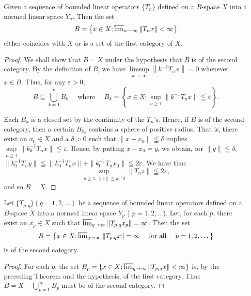 \begin{theoremn} Given a sequence of bounded linear operators $\{T_{n}\}$ defined on a $B$-space $X$ into a normed linear space $Y_{n}$. Then the set
\[
B = \left\{x \in X; \varlimsup\limits_{n \rightarrow \infty} \| T _{n} x \| < \infty \right\}
\]
either coincides with $X$ or is a set of the first category of $X$. 

\end{theoremn}
\begin{proof}
 We shall show that $B = X$ under the hypothesis that $B$ is of the second category. By the definition of $B$, we have $\limsup\limits_{k \to \infty} \left\|k^{-1} T_n x \right\| = 0$ whenever $x \in B$. Thus, for any $\varepsilon > 0$, 
\[
B \subseteq \bigcup\limits_{k=1} ^{\infty} B _{k} \quad \text{ where } \quad B _{k} = \left\{x \in X; \sup\limits _{n \geqq 1} \| k ^{-1} T _{n} x \| \leqq \varepsilon \right\}. \]

Each $B_{k}$ is a closed set by the continuity of the $T_{n}$'s. Hence, if $B$ is of the second category, then a certain $B_{k_0}$ contains a sphere of positive radius. That is, there exist an $x_0 \in X$ and a $\delta > 0$ such that $\|x - x_0\| \leqq \delta$ implies $\sup\limits_{n \geqq 1} \|k_0^{-1}T_n x\| \leqq \varepsilon$. Hence, by putting $x - x_0 = y$, we obtain, for $\|y\| \leqq \delta$, $\|k_0^{-1}T_n y\| \leqq \|k_0^{-1}T_n x\| + \|k_0^{-1}T_n x_0\| \leqq 2\varepsilon$. We have thus 
\[
\sup\limits _ {n \geqq 1, \| z \| \leqq k _{0} ^{-1} \delta} \| T _{n} z \| \leqq 2 \varepsilon ,
\]
and so $B = X$. 
\end{proof}

\begin{corollaryn} Let $\{T_{p,q}\} (q = 1,2,\ldots)$ be a sequence of bounded linear operators defined on a $B$-space $X$ into a normed linear space $Y_{p}$ ( $p = 1,2,\ldots$). Let, for each $p$, there exist an $x_{p} \in X$ such that $\varlimsup\limits_{q \to \infty} \|T_{p,q} x_{p}\| = \infty$. Then the set
\[
B = \left\{x \in X; \varlimsup\limits_{q \rightarrow \infty} \| T _{p,q} x \| = \infty \quad \text{ for all } \quad p = 1, 2, \dots \right\}
\]
is of the second category. 

\end{corollaryn}
\begin{proof}
 For each $p$, the set $B_{p} = \{x \in X; \varlimsup\limits_{q \to \infty} \|T_{p,q} x\| < \infty\}$ is, by the preceding Theorem and the hypothesis, of the first category. Thus $B = X - \bigcup\limits_{p=1}^{\infty} B_{p}$ must be of the second category. 
\end{proof}

